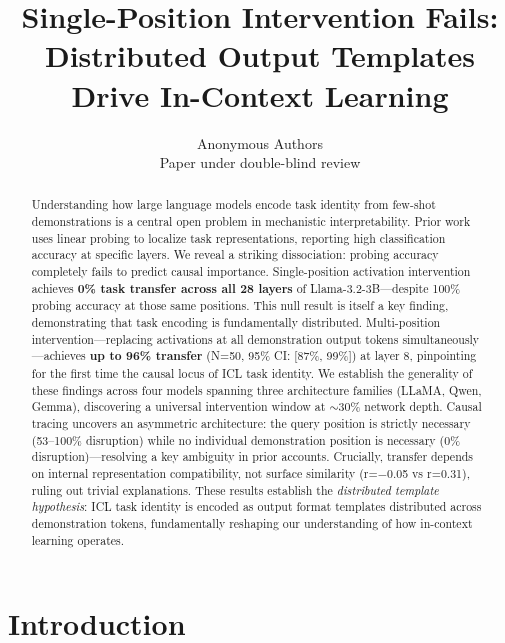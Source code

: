 \documentclass{article}
\begin{document}
\title{Single-Position Intervention Fails: \\
Distributed Output Templates Drive In-Context Learning}

\author{Anonymous Authors \\
Paper under double-blind review}

\maketitle

\begin{abstract}
Understanding how large language models encode task identity from few-shot demonstrations is a central open problem in mechanistic interpretability. Prior work uses linear probing to localize task representations, reporting high classification accuracy at specific layers. We reveal a striking dissociation: probing accuracy completely fails to predict causal importance. Single-position activation intervention achieves \textbf{0\% task transfer across all 28 layers} of Llama-3.2-3B---despite 100\% probing accuracy at those same positions. This null result is itself a key finding, demonstrating that task encoding is fundamentally distributed. Multi-position intervention---replacing activations at all demonstration output tokens simultaneously---achieves \textbf{up to 96\% transfer} (N=50, 95\% CI: [87\%, 99\%]) at layer 8, pinpointing for the first time the causal locus of ICL task identity. We establish the generality of these findings across four models spanning three architecture families (LLaMA, Qwen, Gemma), discovering a universal intervention window at $\sim$30\% network depth. Causal tracing uncovers an asymmetric architecture: the query position is strictly necessary (53--100\% disruption) while no individual demonstration position is necessary (0\% disruption)---resolving a key ambiguity in prior accounts. Crucially, transfer depends on internal representation compatibility, not surface similarity (r=$-$0.05 vs r=0.31), ruling out trivial explanations. These results establish the \emph{distributed template hypothesis}: ICL task identity is encoded as output format templates distributed across demonstration tokens, fundamentally reshaping our understanding of how in-context learning operates.
\end{abstract}

\section{Introduction}
\label{sec:intro}
\end{document}
